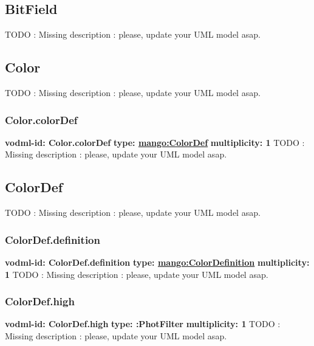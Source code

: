   \subsection{BitField}
  \label{sect:BitField}
    TODO : Missing description : please, update your UML model asap.

  \subsection{Color}
  \label{sect:Color}
    TODO : Missing description : please, update your UML model asap.

    \subsubsection{Color.colorDef}
      \textbf{vodml-id: Color.colorDef} \newline
      \textbf{type: \hyperref[sect:ColorDef]{mango:ColorDef}} \newline
      \textbf{multiplicity: 1} \newline
      TODO : Missing description : please, update your UML model asap.

  \subsection{ColorDef}
  \label{sect:ColorDef}
    TODO : Missing description : please, update your UML model asap.

    \subsubsection{ColorDef.definition}
      \textbf{vodml-id: ColorDef.definition} \newline
      \textbf{type: \hyperref[sect:ColorDefinition]{mango:ColorDefinition}} \newline
      \textbf{multiplicity: 1} \newline
      TODO : Missing description : please, update your UML model asap.

    \subsubsection{ColorDef.high}
      \textbf{vodml-id: ColorDef.high} \newline
      \textbf{type: :PhotFilter} \newline
      \textbf{multiplicity: 1} \newline
      TODO : Missing description : please, update your UML model asap.

